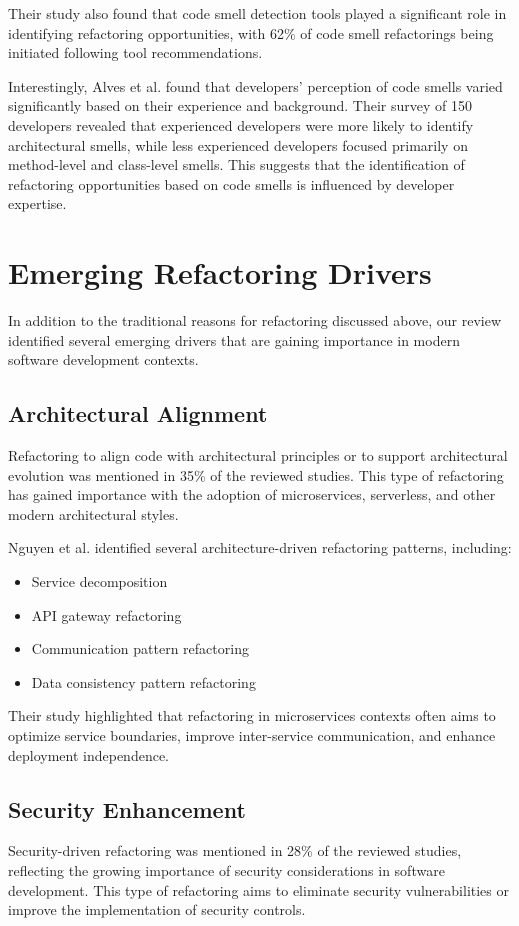 \documentclass[journal,onecolumn]{IEEEtran}
\begin{document}
Their study also found that code smell detection tools played a significant role in identifying refactoring opportunities, with 62\% of code smell refactorings being initiated following tool recommendations.

Interestingly, Alves et al. \cite{alves2023} found that developers' perception of code smells varied significantly based on their experience and background. Their survey of 150 developers revealed that experienced developers were more likely to identify architectural smells, while less experienced developers focused primarily on method-level and class-level smells. This suggests that the identification of refactoring opportunities based on code smells is influenced by developer expertise.

\section{Emerging Refactoring Drivers}
In addition to the traditional reasons for refactoring discussed above, our review identified several emerging drivers that are gaining importance in modern software development contexts.

\subsection{Architectural Alignment}
Refactoring to align code with architectural principles or to support architectural evolution was mentioned in 35\% of the reviewed studies. This type of refactoring has gained importance with the adoption of microservices, serverless, and other modern architectural styles.

Nguyen et al. \cite{nguyen2023} identified several architecture-driven refactoring patterns, including:
\begin{itemize}
    \item Service decomposition
    \item API gateway refactoring
    \item Communication pattern refactoring
    \item Data consistency pattern refactoring
\end{itemize}

Their study highlighted that refactoring in microservices contexts often aims to optimize service boundaries, improve inter-service communication, and enhance deployment independence.

\subsection{Security Enhancement}
Security-driven refactoring was mentioned in 28\% of the reviewed studies, reflecting the growing importance of security considerations in software development. This type of refactoring aims to eliminate security vulnerabilities or improve the implementation of security controls.
\end{document}
